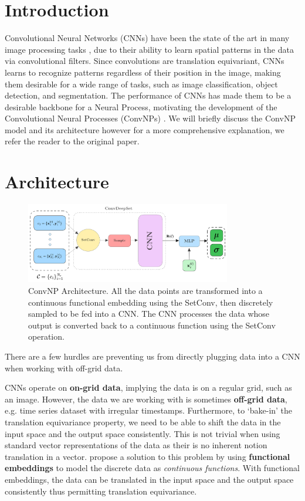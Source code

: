 \documentclass[../../main.tex]{subfiles}
\begin{document}
\section{Introduction}

Convolutional Neural Networks (CNNs) have been the state of the art in many image processing tasks \parencite{he2015deep, simonyan2015deep, NIPS2012_c399862d}, due to their ability to learn spatial patterns in the data via convolutional filters. Since convolutions are translation equivariant, CNNs learns to recognize patterns regardless of their position in the image, making them desirable for a wide range of tasks, such as image classification, object detection, and segmentation. The performance of CNNs has made them to be a desirable backbone for a Neural Process, motivating the development of the Convolutional Neural Processes (ConvNPs) \parencite{gordon2020convolutional}. We will briefly discuss the ConvNP model and its architecture however for a more comprehensive  explanation, we refer the reader to the original paper.

\section{Architecture}

\begin{figure}[H]
	\centering
	\includegraphics[width=0.8\textwidth]{convcnp.png}
	\caption{ConvNP Architecture. All the data points are transformed into a continuous functional embedding using the SetConv, then discretely sampled to be fed into a CNN. The CNN processes the data whose output is converted back to a continuous function using the SetConv operation.}
	\label{fig:convcnp}
\end{figure}


There are a few hurdles are preventing us from directly plugging data into a CNN when working with off-grid data.	

CNNs operate on \textbf{on-grid data}, implying the data is on a regular grid, such as an image. However, the data we are working with is sometimes \textbf{off-grid data}, e.g. time series dataset with irregular timestamps. Furthermore, to `bake-in' the translation equivariance property, we need to be able to shift the data in the input space and the output space consistently. This is not trivial when using standard vector representations of the data as their is no inherent notion translation in a vector.
\cite{gordon2020convolutional} propose a solution to this problem by using \textbf{functional embeddings} to model the discrete data as \emph{continuous functions}. With functional embeddings, the data can be translated in the input space and the output space consistently thus permitting translation equivariance.
\end{document}
